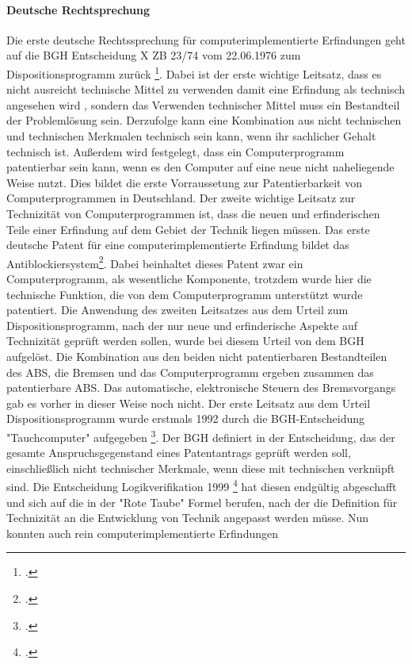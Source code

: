 \paragraph{Deutsche Rechtsprechung\label{par:deur}}
Die erste deutsche Rechtssprechung für computerimplementierte Erfindungen
geht auf die 
BGH Entscheidung X ZB 23/74 vom 22.06.1976 zum Dispositionsprogramm zurück 
\footcite{BGH22061976}. 
Dabei ist der erste wichtige Leitsatz, dass es nicht ausreicht technische Mittel
zu verwenden damit eine Erfindung als technisch angesehen wird
, sondern das Verwenden technischer Mittel muss ein Bestandteil der Problemlösung sein.
Derzufolge kann eine Kombination aus nicht technischen und technischen 
Merkmalen technisch sein kann, wenn ihr sachlicher Gehalt technisch ist.
Außerdem wird festgelegt, dass ein Computerprogramm patentierbar sein
kann, wenn es den Computer auf eine neue nicht naheliegende Weise nutzt.
Dies bildet die erste Vorraussetung zur Patentierbarkeit von Computerprogrammen
in Deutschland. 
Der zweite wichtige Leitsatz zur Technizität von Computerprogrammen ist,
dass die neuen und erfinderischen Teile 
einer Erfindung auf dem Gebiet der Technik liegen müssen.
Das erste deutsche Patent für eine computerimplementierte Erfindung bildet 
das Antiblockiersystem\footcite{Bundesgerichtshof13051980}.
Dabei beinhaltet dieses Patent zwar ein Computerprogramm,
als wesentliche Komponente, trotzdem wurde hier die technische Funktion,
die von dem Computerprogramm unterstützt wurde patentiert.
Die Anwendung des zweiten Leitsatzes aus dem Urteil zum Dispositionsprogramm, 
nach der nur neue und erfinderische Aspekte auf Technizität geprüft werden sollen,
wurde bei diesem Urteil von dem BGH aufgelöst. 
Die Kombination aus den beiden nicht patentierbaren Bestandteilen
des ABS, die Bremsen und das Computerprogramm ergeben zusammen 
das patentierbare ABS. 
Das automatische, elektronische Steuern des Bremsvorgangs gab es vorher 
in dieser Weise noch nicht.
Der erste Leitsatz aus dem Urteil Dispositionsprogramm wurde
erstmals 1992 durch die BGH-Entscheidung "Tauchcomputer"
aufgegeben \footcite{BGH04021992}. 
Der BGH definiert in der Entscheidung, das der gesamte Anspruchsgegenstand
eines Patentantrags geprüft werden soll, 
einschließlich nicht technischer Merkmale,
wenn diese mit technischen verknüpft sind.
Die Entscheidung Logikverifikation 1999 \footcite{BGH13121999}
hat diesen endgültig abgeschafft und
sich auf die in der "Rote Taube" Formel
berufen, nach der die Definition für Technizität 
an die Entwicklung von Technik angepasst werden müsse.
Nun konnten auch rein computerimplementierte Erfindungen 

